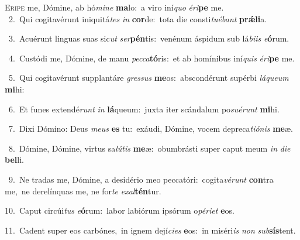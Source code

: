 \lettrine{\initial\textcolor{\initialcolor}{E}}{ripe} me, Dómine, ab hó\-\textit{mi}\-\textit{ne} \textbf{ma}\-lo:~\star a viro iní\textit{quo} \textit{é}\-\textit{ri}\textbf{pe} me.\\
{\numbfont\textcolor{\numbcolor}{~2.}}~Qui cogitavérunt iniquitá\textit{tes} \textit{in} \textbf{cor}\-de:~\star tota die consti\-\textit{tu}\-\textit{é}\textit{bant} \textbf{prǽ}\-\textbf{li}a.\par
{\numbfont\textcolor{\numbcolor}{~3.}}~Acuérunt linguas suas sic\textit{ut} \textit{ser}\-\textbf{pén}tis:~\star venénum áspidum sub lá\-\textit{bi}\-\textit{is} \textit{e}\-\textbf{ó}rum.\par
{\numbfont\textcolor{\numbcolor}{~4.}}~Custódi me, Dómine, de manu \textit{pec}\-\textit{ca}\textbf{tó}ris:~\star et ab homínibus iní\textit{quis} \textit{é}\-\textit{ri}\textbf{pe} me.\par
{\numbfont\textcolor{\numbcolor}{~5.}}~Qui cogitavérunt supplantáre \textit{gres}\-\textit{sus} \textbf{me}\-os:~\star abscondérunt supérbi \textit{lá}\-\textit{que}\textit{um} \textbf{mi}\-hi:\par
{\numbfont\textcolor{\numbcolor}{~6.}}~Et funes extendé\textit{runt} \textit{in} \textbf{lá}\-queum:~\star juxta iter scándalum po\-\textit{su}\-\textit{é}\textit{runt} \textbf{mi}\-hi.\par
{\numbfont\textcolor{\numbcolor}{~7.}}~Dixi Dómino: Deus \textit{me}\-\textit{us} \textbf{es} tu:~\star exáudi, Dómine, vocem depreca\-\textit{ti}\-\textit{ó}\textit{nis} \textbf{me}\-æ.\par
{\numbfont\textcolor{\numbcolor}{~8.}}~Dómine, Dómine, virtus sa\-\textit{lú}\-\textit{tis} \textbf{me}\-æ:~\star obumbrásti super caput meum \textit{in} \textit{di}\-\textit{e} \textbf{bel}\-li.\par
{\numbfont\textcolor{\numbcolor}{~9.}}~Ne tradas me, Dómine, a desidério meo peccatóri:~\dagger cogita\-\textit{vé}\-\textit{runt} \textbf{con}\-tra me,~\star ne derelínquas me, ne for\textit{te} \textit{ex}\-\textit{al}\textbf{tén}tur.\par
{\numbfont\textcolor{\numbcolor}{10.}}~Caput circúi\textit{tus} \textit{e}\-\textbf{ó}rum:~\star labor labiórum ipsórum o\-\textit{pé}\-\textit{ri}\textit{et} \textbf{e}\-os.\par
{\numbfont\textcolor{\numbcolor}{11.}}~Cadent super eos carbónes,~\dagger in ignem dejí\-\textit{ci}\-\textit{es} \textbf{e}\-os:~\star in miséri\textit{is} \textit{non} \textit{sub}\-\textbf{sís}tent.\par
